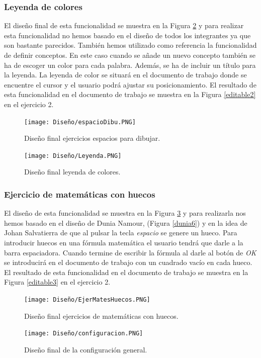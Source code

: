 \subsubsection{Leyenda de colores}
El diseño final de esta funcionalidad se muestra en la Figura \ref{LeyendaColores} y para realizar esta funcionalidad no hemos basado en el diseño de todos los integrantes ya que son bastante parecidos. También hemos utilizado como referencia la funcionalidad de definir conceptos. En este caso cuando se añade un nuevo concepto también se ha de escoger un color para cada palabra. Además, se ha de incluir un título para la leyenda. La leyenda de color se situará en el documento de trabajo donde se encuentre el cursor y el usuario podrá ajustar su posicionamiento. El resultado de esta funcionalidad en el documento de trabajo se muestra en la Figura \ref{editable2} en el ejercicio 2.

\begin{multicols}{2}
  \begin{figure}[H]
    \centering
    \texttt{[image: Diseño/espacioDibu.PNG]}
    \caption{Diseño final ejercicios espacios para dibujar.}
    \label{espaciosDibu}
  \end{figure}
  \begin{figure}[H]
    \centering
    \texttt{[image: Diseño/Leyenda.PNG]}
    \caption{Diseño final leyenda de colores.}
    \label{LeyendaColores}
  \end{figure}
\end{multicols}

\subsubsection{Ejercicio de matemáticas con huecos}
El diseño de esta funcionalidad se muestra en la Figura \ref{matesHueco} y para realizarla nos hemos basado en el diseño de Dunia Namour, (Figura \ref{dunia6}) y en la idea de Johan Salvatierra de que al pulsar la tecla \textit{espacio} se genere un hueco. Para introducir huecos en una fórmula matemática el usuario tendrá que darle a la barra espaciadora. Cuando termine de escribir la fórmula al darle al botón de \textit{OK} se introducirá en el documento de trabajo con un cuadrado vacío en cada hueco. El resultado de esta funcionalidad en el documento de trabajo se muestra en la Figura \ref{editable3} en el ejercicio 2.

\begin{figure}[ht!]
  \centering
  \texttt{[image: Diseño/EjerMatesHuecos.PNG]}
  \caption{Diseño final ejercicios de matemáticas con huecos.}
  \label{matesHueco}
\end{figure}
\begin{figure}[ht!]
  \centering
  \texttt{[image: Diseño/configuracion.PNG]}
  \caption{Diseño final de la configuración general.}
  \label{configu}
\end{figure}
